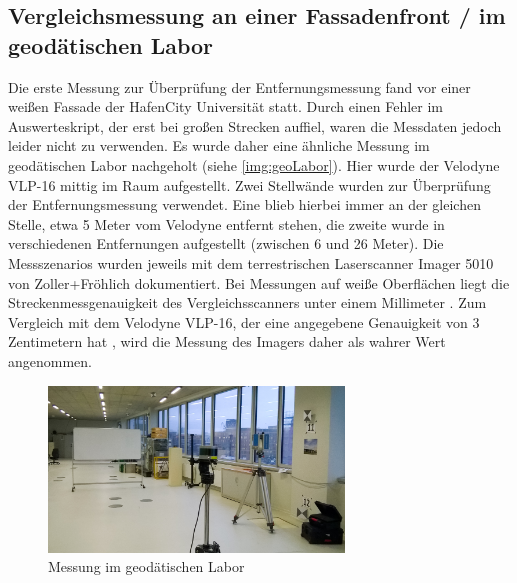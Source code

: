 \documentclass[a4paper,12pt,bibliography=totoc, listof=totoc,titlepage,pointlessnumbers]{scrreprt}
\begin{document}
\subsection{Vergleichsmessung an einer Fassadenfront / im geodätischen Labor}
Die erste Messung zur Überprüfung der Entfernungsmessung fand vor einer weißen Fassade der HafenCity Universität statt. Durch einen Fehler im Auswerteskript, der erst bei großen Strecken auffiel, waren die Messdaten jedoch leider nicht zu verwenden. Es wurde daher eine ähnliche Messung im geodätischen Labor nachgeholt (siehe \autoref{img:geoLabor}).
Hier wurde der Velodyne VLP-16 mittig im Raum aufgestellt. Zwei Stellwände wurden zur Überprüfung der Entfernungsmessung verwendet. Eine blieb hierbei immer an der gleichen Stelle, etwa 5 Meter vom Velodyne entfernt stehen, die zweite wurde in verschiedenen Entfernungen aufgestellt (zwischen 6 und 26 Meter). Die Messszenarios wurden jeweils mit dem terrestrischen Laserscanner Imager 5010 von Zoller+Fröhlich dokumentiert. Bei Messungen auf weiße Oberflächen liegt die Streckenmessgenauigkeit des Vergleichsscanners unter einem Millimeter \citep{imager5010}. Zum Vergleich mit dem Velodyne VLP-16, der eine angegebene Genauigkeit von 3 Zentimetern hat \citep{vlpSheet}, wird die Messung des Imagers daher als wahrer Wert angenommen.

\begin{figure}
 \centering
 \includegraphics[width=0.7\textwidth]{./img/geoLabor.jpg}
 \caption{Messung im geodätischen Labor}
 \label{img:geoLabor}
\end{figure}
\end{document}
